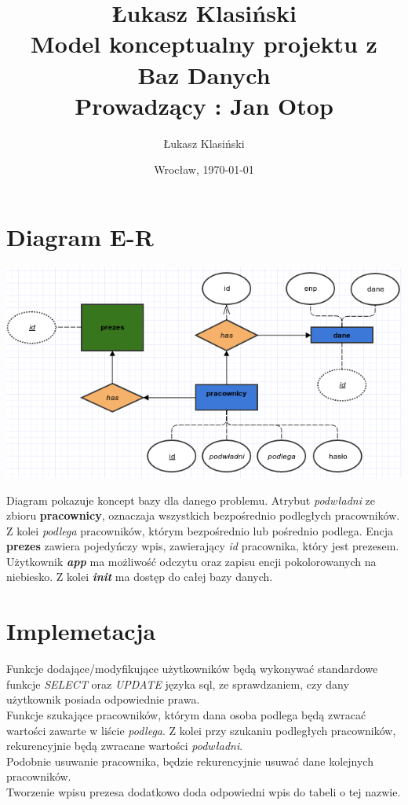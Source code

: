 \documentclass[11pt, wide]{article}
\author{Łukasz Klasiński}
\date{Wrocław, \today}
\title{Łukasz Klasiński\\\LARGE\textbf{Model konceptualny projektu z \\Baz Danych\\}
    Prowadzący : Jan Otop}
\begin{document}
    \maketitle
    \thispagestyle{empty}
    \section{Diagram E-R }
    \includegraphics[width=\textwidth]{er}    

    Diagram pokazuje koncept bazy dla danego problemu. Atrybut \textit{podwładni}
    ze zbioru \textbf{pracownicy}, oznaczaja wszystkich bezpośrednio podległych pracowników. Z kolei
    \textit{podlega} pracowników, którym bezpośrednio lub pośrednio podlega. 
    Encja \textbf{prezes} zawiera pojedyńczy wpis, zawierający \textit{id} pracownika, który
    jest prezesem.\\

    Użytkownik \textbf{\textit{app}} ma możliwość odczytu oraz zapisu encji pokolorowanych
    na niebiesko. Z kolei \textbf{\textit{init}} ma dostęp do całej bazy danych.

    \section{Implemetacja}
    Funkcje dodające/modyfikujące użytkowników będą wykonywać standardowe
    funkcje \textit{SELECT} oraz \textit{UPDATE} języka sql, ze sprawdzaniem, czy 
    dany użytkownik posiada odpowiednie prawa.\\    
    Funkcje szukające pracowników, którym dana osoba podlega będą zwracać wartości zawarte w liście \textit{podlega}. 
    Z kolei przy szukaniu podległych pracowników, rekurencyjnie będą zwracane wartości \textit{podwładni}.
    \\Podobnie usuwanie pracownika, będzie rekurencyjnie usuwać dane kolejnych pracowników.
    \\Tworzenie wpisu prezesa dodatkowo doda odpowiedni wpis do tabeli o tej nazwie.
\end{document}
